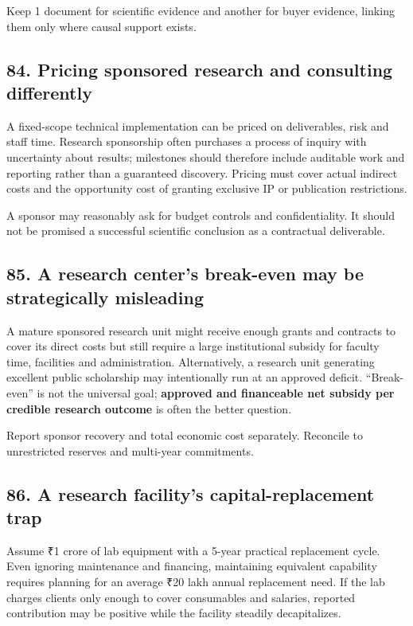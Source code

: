 Keep 1 document for scientific evidence and another for buyer evidence, linking them only where causal support exists.

\subsection{84. Pricing sponsored research and consulting differently}

A fixed-scope technical implementation can be priced on deliverables, risk and staff time. Research sponsorship often purchases a process of inquiry with uncertainty about results; milestones should therefore include auditable work and reporting rather than a guaranteed discovery. Pricing must cover actual indirect costs and the opportunity cost of granting exclusive IP or publication restrictions.

A sponsor may reasonably ask for budget controls and confidentiality. It should not be promised a successful scientific conclusion as a contractual deliverable.

\subsection{85. A research center's break-even may be strategically misleading}

A mature sponsored research unit might receive enough grants and contracts to cover its direct costs but still require a large institutional subsidy for faculty time, facilities and administration. Alternatively, a research unit generating excellent public scholarship may intentionally run at an approved deficit. ``Break-even'' is not the universal goal; \textbf{approved and financeable net subsidy per credible research outcome} is often the better question.

Report sponsor recovery and total economic cost separately. Reconcile to unrestricted reserves and multi-year commitments.

\subsection{86. A research facility's capital-replacement trap}

Assume ₹1 crore of lab equipment with a 5-year practical replacement cycle. Even ignoring maintenance and financing, maintaining equivalent capability requires planning for an average ₹20 lakh annual replacement need. If the lab charges clients only enough to cover consumables and salaries, reported contribution may be positive while the facility steadily decapitalizes.


